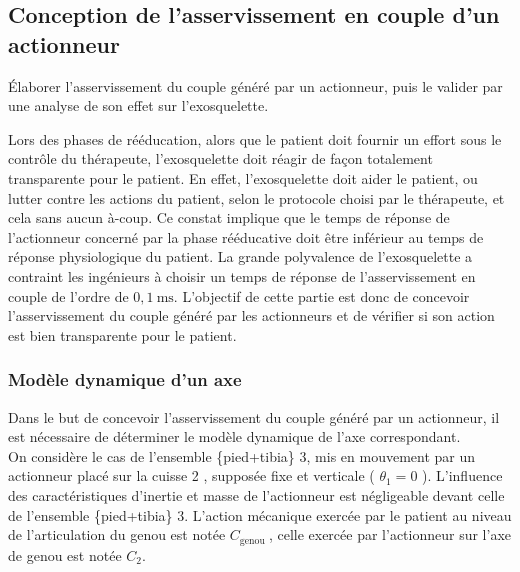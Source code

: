 \subsection{Conception de l'asservissement en couple d'un actionneur}
\begin{obj}
Élaborer l'asservissement du couple généré par un actionneur, puis le valider par une analyse de son effet sur l'exosquelette.
\end{obj}

Lors des phases de rééducation, alors que le patient doit fournir un effort sous le contrôle du thérapeute, l'exosquelette doit réagir de façon totalement transparente pour le patient. En effet, l'exosquelette doit aider le patient, ou lutter contre les actions du patient, selon le protocole choisi par le thérapeute, et cela sans aucun à-coup. Ce constat implique que le temps de réponse de l'actionneur concerné par la phase rééducative doit être inférieur au temps de réponse physiologique du patient. La grande polyvalence de l'exosquelette a contraint les ingénieurs à choisir un temps de réponse de l'asservissement en couple de l'ordre de $0,1 \mathrm{~ms}$. L'objectif de cette partie est donc de concevoir l'asservissement du couple généré par les actionneurs et de vérifier si son action est bien transparente pour le patient.

\subsubsection{Modèle dynamique d'un axe}
Dans le but de concevoir l'asservissement du couple généré par un actionneur, il est nécessaire de déterminer le modèle dynamique de l'axe correspondant.\\
On considère le cas de l'ensemble \{pied+tibia\} 3, mis en mouvement par un actionneur placé sur la cuisse 2 , supposée fixe et verticale ( $\theta_{1}=0$ ). L'influence des caractéristiques d'inertie et masse de l'actionneur est négligeable devant celle de l'ensemble \{pied+tibia\} 3. L'action mécanique exercée par le patient au niveau de l'articulation du genou est notée $C_{\text {genou }}$, celle exercée par l'actionneur sur l'axe de genou est notée $C_{2}$.\\

